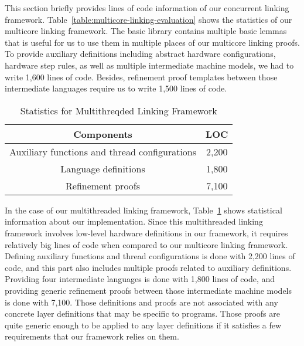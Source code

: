 This section briefly provides lines of code information of our concurrent linking framework. 
Table~\ref{table:multicore-linking-evaluation} shows the statistics of our multicore linking framework. 
The basic library contains multiple basic lemmas that is useful for us to use them in multiple places of our multicore linking proofs. 
To provide auxiliary definitions including abstract hardware configurations, hardware step rules, as well as multiple intermediate machine models, we had to write 1,600 lines of code.
Besides, refinement proof templates between those intermediate languages require us to write 1,500 lines of code.
\begin{table}
\begin{center}
\renewcommand{\arraystretch}{1.1}
\setlength{\tabcolsep}{0.3em}
\begin{tabular}{|c|c|}
\hline
Components  & LOC\\
\hline
\hline
Auxiliary functions and thread configurations & 2,200 \\
\hline
Language definitions & 1,800 \\
\hline
Refinement proofs & 7,100 \\
\hline
\end{tabular}
\end{center}
\caption{Statistics for Multithreqded Linking Framework}
\label{table:multithreaded-linking-evaluation}
\hrulefill
\end{table}
In the case of our multithreaded linking framework, Table~\ref{table:multithreaded-linking-evaluation} shows statistical information about our implementation. 
Since this multithreaded linking framework involves low-level hardware definitions in our framework, it requires relatively big lines of code when compared to our multicore linking framework. 
Defining auxiliary functions and thread configurations is done with 2,200 lines of code, and this part also includes multiple proofs related to auxiliary definitions. 
Providing four intermediate languages is done with   1,800 lines of code, and providing generic refinement proofs between those intermediate machine models is done with 7,100. 
Those definitions and proofs are not associated with any concrete layer definitions that may be specific to programs. 
Those proofs are quite generic enough to be applied to any layer definitions if it satisfies a few requirements that our framework relies on them.


